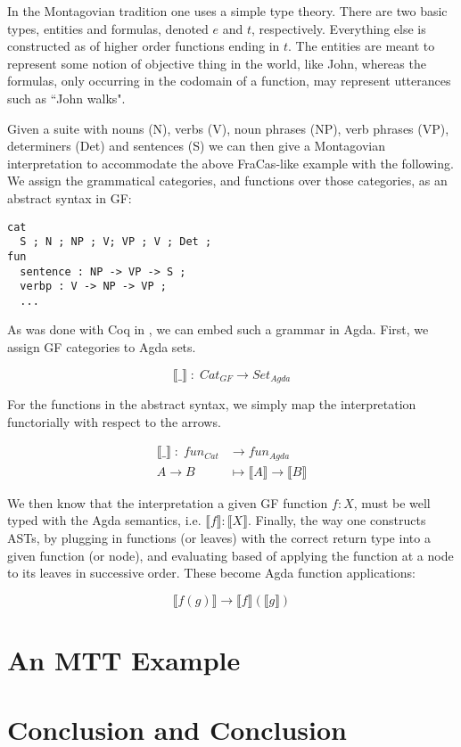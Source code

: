 \documentclass[a4paper, 11pt]{article}
\begin{document}
In the Montagovian tradition one uses a simple type theory. There are two
basic types, entities and formulas, denoted $e$ and $t$, respectively.
Everything else is constructed as of higher order functions ending in $t$. The
entities are meant to represent some notion of objective thing in the world,
like John, whereas the formulas, only occurring in the codomain of a function,
may represent utterances such as ``John walks".

Given a suite with nouns (N), verbs (V), noun phrases (NP), verb phrases (VP),
determiners (Det) and sentences (S) we can then give a Montagovian
interpretation to accommodate the above FraCas-like example with the following.
We assign the grammatical categories, and functions over those categories, as an
abstract syntax in GF:

\begin{verbatim}
cat
  S ; N ; NP ; V; VP ; V ; Det ;
fun
  sentence : NP -> VP -> S ;
  verbp : V -> NP -> VP ;
  ...
\end{verbatim}

As was done with Coq in \cite{fracoq}, we can embed such a grammar in Agda.
First, we assign GF categories to Agda sets.

$$\llbracket\_\rrbracket\; {:}\; Cat_{GF} \rightarrow Set_{Agda}$$

For the functions in the abstract syntax, we simply map the interpretation
functorially with respect to the arrows.

\begin{align*}
  \llbracket\_\rrbracket\; {:}\; fun_{Cat} &\longrightarrow fun_{Agda}\\
  A \rightarrow B &\mapsto \llbracket A \rrbracket \rightarrow \llbracket B \rrbracket
\end{align*}

We then know that the interpretation a given GF function $f {:} X$, must be well
typed with the Agda semantics, i.e. $\llbracket f \rrbracket {:} \llbracket X
\rrbracket$. Finally, the way one constructs ASTs, by plugging in functions (or
leaves) with the correct return type into a given function (or node), and
evaluating based of applying the function at a node to its leaves in successive
order. These become Agda function applications:

$$\llbracket f(g) \rrbracket \rightarrow \llbracket f \rrbracket (\llbracket g \rrbracket)$$



\section{An MTT Example}



\section{Conclusion and Conclusion}

\printbibliography
\end{document}
